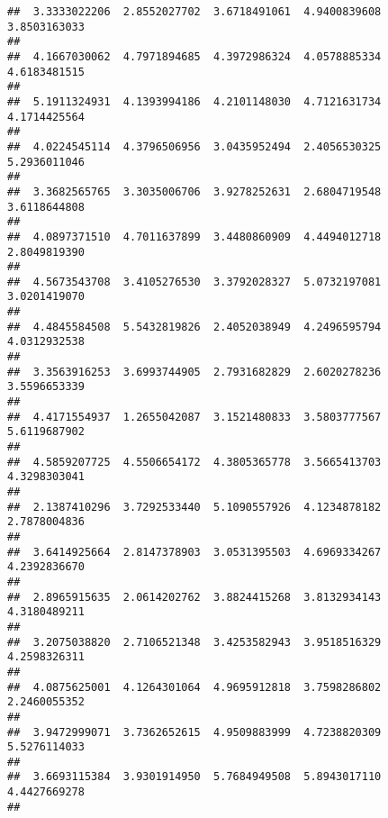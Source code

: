 \documentclass[]{article}
\begin{document}
\begin{verbatim}
##  3.3333022206  2.8552027702  3.6718491061  4.9400839608  3.8503163033 
##                                                                       
##  4.1667030062  4.7971894685  4.3972986324  4.0578885334  4.6183481515 
##                                                                       
##  5.1911324931  4.1393994186  4.2101148030  4.7121631734  4.1714425564 
##                                                                       
##  4.0224545114  4.3796506956  3.0435952494  2.4056530325  5.2936011046 
##                                                                       
##  3.3682565765  3.3035006706  3.9278252631  2.6804719548  3.6118644808 
##                                                                       
##  4.0897371510  4.7011637899  3.4480860909  4.4494012718  2.8049819390 
##                                                                       
##  4.5673543708  3.4105276530  3.3792028327  5.0732197081  3.0201419070 
##                                                                       
##  4.4845584508  5.5432819826  2.4052038949  4.2496595794  4.0312932538 
##                                                                       
##  3.3563916253  3.6993744905  2.7931682829  2.6020278236  3.5596653339 
##                                                                       
##  4.4171554937  1.2655042087  3.1521480833  3.5803777567  5.6119687902 
##                                                                       
##  4.5859207725  4.5506654172  4.3805365778  3.5665413703  4.3298303041 
##                                                                       
##  2.1387410296  3.7292533440  5.1090557926  4.1234878182  2.7878004836 
##                                                                       
##  3.6414925664  2.8147378903  3.0531395503  4.6969334267  4.2392836670 
##                                                                       
##  2.8965915635  2.0614202762  3.8824415268  3.8132934143  4.3180489211 
##                                                                       
##  3.2075038820  2.7106521348  3.4253582943  3.9518516329  4.2598326311 
##                                                                       
##  4.0875625001  4.1264301064  4.9695912818  3.7598286802  2.2460055352 
##                                                                       
##  3.9472999071  3.7362652615  4.9509883999  4.7238820309  5.5276114033 
##                                                                       
##  3.6693115384  3.9301914950  5.7684949508  5.8943017110  4.4427669278 
##                                                                       

\end{verbatim}
\end{document}
